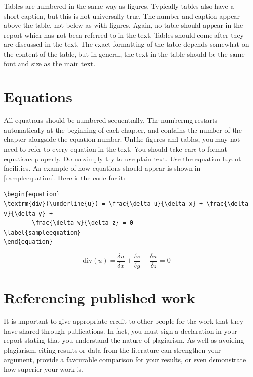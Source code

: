 Tables are numbered in the same way as figures. Typically tables also have a short caption, but this is not universally true. The number and caption appear above the table, not below as with figures. Again, no table should appear in the report which has not been referred to in the text. Tables should come after they are discussed in the text. The exact formatting of the table depends somewhat on the content of the table, but in general, the text in the table should be the same font and size as the main text. 

\section{Equations}
All equations should be numbered sequentially. The numbering restarts automatically at the beginning of each chapter, and contains the number of the chapter alongside the equation number. Unlike figures and tables, you may not need to refer to every equation in the text. You should take care to format equations properly. Do no simply try to use plain text. Use the equation layout facilities. An example of how equations should appear is shown in \eqref{sampleequation}. Here is the code for it:

{\footnotesize
\begin{verbatim}
\begin{equation}
\textrm{div}(\underline{u}) = \frac{\delta u}{\delta x} + \frac{\delta v}{\delta y} +
        \frac{\delta w}{\delta z} = 0
\label{sampleequation}
\end{equation} 
\end{verbatim}
}

\begin{equation}
\textrm{div}(\underline{u}) = \frac{\delta u}{\delta x} + \frac{\delta v}{\delta y} + \frac{\delta w}{\delta z} = 0
\label{sampleequation}
\end{equation} 

\section{Referencing published work}
It is important to give appropriate credit to other people for the work that they have shared through publications. In fact, you must sign a declaration in your report stating that you understand the nature of plagiarism. As well as avoiding plagiarism, citing results or data from the literature can strengthen your argument, provide a favourable comparison for your results, or even demonstrate how superior your work is.

